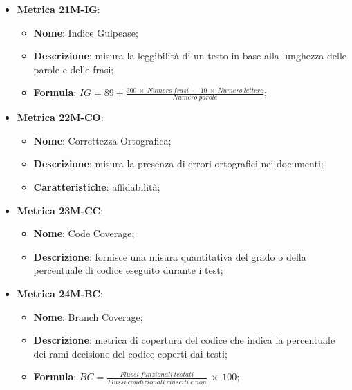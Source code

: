 \begin{itemize}
    \item \textbf{Metrica 21M-IG}:
    \begin{itemize}
        \item \textbf{Nome}: Indice Gulpease;
        \item \textbf{Descrizione}: misura la leggibilità di un testo in base alla lunghezza delle parole e delle frasi;
        \item \textbf{Formula}: $IG = 89 + \frac{300 \:\times \:Numero\:frasi \:- \:10 \:\times\: Numero\:lettere}{Numero\:parole}$;
    \end{itemize}
\end{itemize}

\begin{itemize}
    \item \textbf{Metrica 22M-CO}:
    \begin{itemize}
        \item \textbf{Nome}: Correttezza Ortografica;
        \item \textbf{Descrizione}: misura la presenza di errori ortografici nei documenti;
        \item \textbf{Caratteristiche}: affidabilità;
    \end{itemize}
\end{itemize}

\begin{itemize}
    \item \textbf{Metrica 23M-CC}:
    \begin{itemize}
        \item \textbf{Nome}: Code Coverage;
        \item \textbf{Descrizione}: fornisce una misura quantitativa del grado o della percentuale di codice eseguito durante i test;
    \end{itemize}
\end{itemize}

\begin{itemize}
    \item \textbf{Metrica 24M-BC}:
    \begin{itemize}
        \item \textbf{Nome}: Branch Coverage;
        \item \textbf{Descrizione}: metrica di copertura del codice che indica la percentuale dei rami decisione del codice coperti dai testi;
        \item \textbf{Formula}: $BC =\frac{Flussi\:funzionali\: testati}{Flussi\:condizionali\: riusciti\: e\: non}\: \times \: 100$;
    \end{itemize}
\end{itemize}

